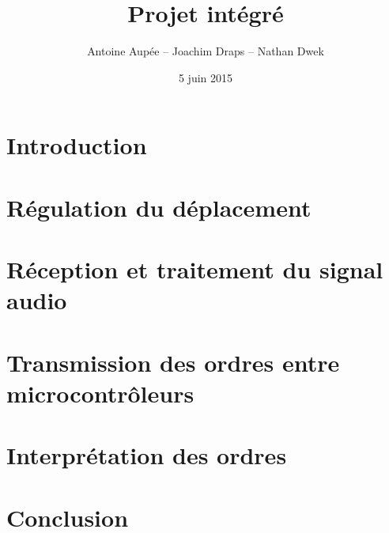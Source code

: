 \documentclass[frenchb]{beamer}
\title{Projet intégré}
\author{Antoine Aupée -- Joachim Draps -- Nathan Dwek}
\date{5 juin 2015}
\begin{document}
\frame{\titlepage}

\section{Introduction}

\section{Régulation du déplacement}
%
\section{Réception et traitement du signal audio}
%
\section{Transmission des ordres entre microcontrôleurs}
%
\section{Interprétation des ordres}
%
\section{Conclusion}

\end{document}
